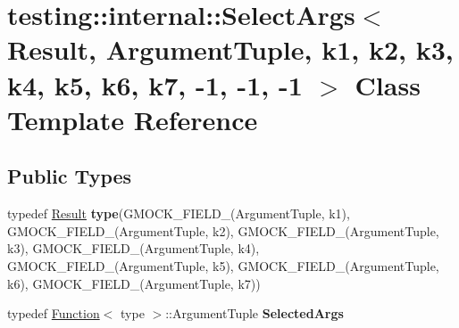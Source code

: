 \hypertarget{classtesting_1_1internal_1_1SelectArgs_3_01Result_00_01ArgumentTuple_00_01k1_00_01k2_00_01k3_00_39929402cb68b57f60e280a41eb60fed}{}\section{testing\+:\+:internal\+:\+:Select\+Args$<$ Result, Argument\+Tuple, k1, k2, k3, k4, k5, k6, k7, -\/1, -\/1, -\/1 $>$ Class Template Reference}
\label{classtesting_1_1internal_1_1SelectArgs_3_01Result_00_01ArgumentTuple_00_01k1_00_01k2_00_01k3_00_39929402cb68b57f60e280a41eb60fed}
\subsection*{Public Types}
\begin{DoxyCompactItemize}
\item 
\mbox{\label{classtesting_1_1internal_1_1SelectArgs_3_01Result_00_01ArgumentTuple_00_01k1_00_01k2_00_01k3_00_39929402cb68b57f60e280a41eb60fed_a9a44113ab59893cfc38ae45451a5b654}} 
typedef \hyperlink{classResult}{Result} {\bfseries type}(G\+M\+O\+C\+K\+\_\+\+F\+I\+E\+L\+D\+\_\+(Argument\+Tuple, k1), G\+M\+O\+C\+K\+\_\+\+F\+I\+E\+L\+D\+\_\+(Argument\+Tuple, k2), G\+M\+O\+C\+K\+\_\+\+F\+I\+E\+L\+D\+\_\+(Argument\+Tuple, k3), G\+M\+O\+C\+K\+\_\+\+F\+I\+E\+L\+D\+\_\+(Argument\+Tuple, k4), G\+M\+O\+C\+K\+\_\+\+F\+I\+E\+L\+D\+\_\+(Argument\+Tuple, k5), G\+M\+O\+C\+K\+\_\+\+F\+I\+E\+L\+D\+\_\+(Argument\+Tuple, k6), G\+M\+O\+C\+K\+\_\+\+F\+I\+E\+L\+D\+\_\+(Argument\+Tuple, k7))
\item 
\mbox{\label{classtesting_1_1internal_1_1SelectArgs_3_01Result_00_01ArgumentTuple_00_01k1_00_01k2_00_01k3_00_39929402cb68b57f60e280a41eb60fed_a128e1c494007a7bffd3d0a88a4dd7825}} 
typedef \hyperlink{structtesting_1_1internal_1_1Function}{Function}$<$ type $>$\+::Argument\+Tuple {\bfseries Selected\+Args}
\end{DoxyCompactItemize}
